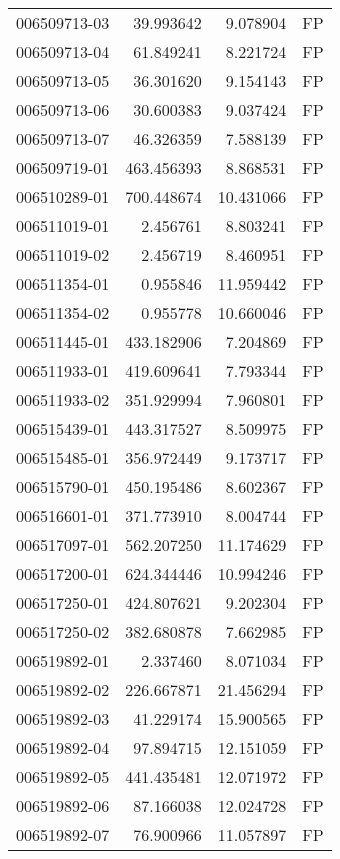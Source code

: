\begin{tabular}{lrrl}
006509713-03 &   39.993642 &     9.078904 &   FP \\
006509713-04 &   61.849241 &     8.221724 &   FP \\
006509713-05 &   36.301620 &     9.154143 &   FP \\
006509713-06 &   30.600383 &     9.037424 &   FP \\
006509713-07 &   46.326359 &     7.588139 &   FP \\
006509719-01 &  463.456393 &     8.868531 &   FP \\
006510289-01 &  700.448674 &    10.431066 &   FP \\
006511019-01 &    2.456761 &     8.803241 &   FP \\
006511019-02 &    2.456719 &     8.460951 &   FP \\
006511354-01 &    0.955846 &    11.959442 &   FP \\
006511354-02 &    0.955778 &    10.660046 &   FP \\
006511445-01 &  433.182906 &     7.204869 &   FP \\
006511933-01 &  419.609641 &     7.793344 &   FP \\
006511933-02 &  351.929994 &     7.960801 &   FP \\
006515439-01 &  443.317527 &     8.509975 &   FP \\
006515485-01 &  356.972449 &     9.173717 &   FP \\
006515790-01 &  450.195486 &     8.602367 &   FP \\
006516601-01 &  371.773910 &     8.004744 &   FP \\
006517097-01 &  562.207250 &    11.174629 &   FP \\
006517200-01 &  624.344446 &    10.994246 &   FP \\
006517250-01 &  424.807621 &     9.202304 &   FP \\
006517250-02 &  382.680878 &     7.662985 &   FP \\
006519892-01 &    2.337460 &     8.071034 &   FP \\
006519892-02 &  226.667871 &    21.456294 &   FP \\
006519892-03 &   41.229174 &    15.900565 &   FP \\
006519892-04 &   97.894715 &    12.151059 &   FP \\
006519892-05 &  441.435481 &    12.071972 &   FP \\
006519892-06 &   87.166038 &    12.024728 &   FP \\
006519892-07 &   76.900966 &    11.057897 &   FP \\

\end{tabular}

